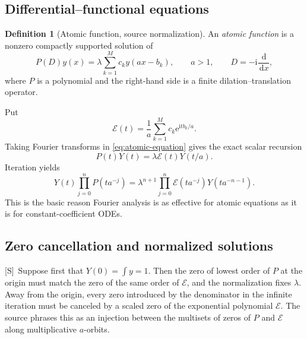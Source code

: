 \documentclass[11pt,oneside]{article}
\theoremstyle{definition}
\newtheorem{definition}[theorem]{Definition}
\theoremstyle{remark}
\newcommand{\e}{\mathrm e}
\newcommand{\ii}{\mathrm i}
\newcommand{\dd}{\,\mathrm d}
\newcommand{\Smark}{\textcolor{sourceblue}{\textsf{[S]}}}
\begin{document}
\subsection{Differential--functional equations}

\begin{definition}[Atomic function, source normalization]
\label{def:atomic}
An \emph{atomic function} is a nonzero compactly supported solution of
\begin{equation}
 P(D)y(x)=\lambda\sum_{k=1}^{M}c_k y(ax-b_k),
 \qquad a>1,
 \qquad D=-\ii\frac{\dd}{\dd x},
 \label{eq:atomic-equation}
\end{equation}
where $P$ is a polynomial and the right-hand side is a finite dilation--translation operator.
\end{definition}

Put
\begin{equation}
 \mathcal E(t)=\frac1a\sum_{k=1}^{M}c_k\e^{\ii tb_k/a}.
 \label{eq:E-mask}
\end{equation}
Taking Fourier transforms in \eqref{eq:atomic-equation} gives the exact scalar recursion
\begin{equation}
 P(t)Y(t)=\lambda\mathcal E(t)Y(t/a).
 \tag{S3.2}
 \label{eq:fourier-recursion-general}
\end{equation}
Iteration yields
\begin{equation}
 Y(t)\prod_{j=0}^{n}P(ta^{-j})
 =\lambda^{n+1}\prod_{j=0}^{n}\mathcal E(ta^{-j})Y(ta^{-n-1}).
 \tag{S3.7}
 \label{eq:iterated-general}
\end{equation}
This is the basic reason Fourier analysis is as effective for atomic equations as it is for
constant-coefficient ODEs.

\subsection{Zero cancellation and normalized solutions}

\Smark\ Suppose first that $Y(0)=\int y=1$.  Then the zero of lowest order of $P$ at the
origin must match the zero of the same order of $\mathcal E$, and the normalization fixes
$\lambda$.  Away from the origin, every zero introduced by the denominator in the infinite
iteration must be canceled by a scaled zero of the exponential polynomial $\mathcal E$.
The source phrases this as an injection between the multisets of zeros of $P$ and
$\mathcal E$ along multiplicative $a$-orbits.
\end{document}
